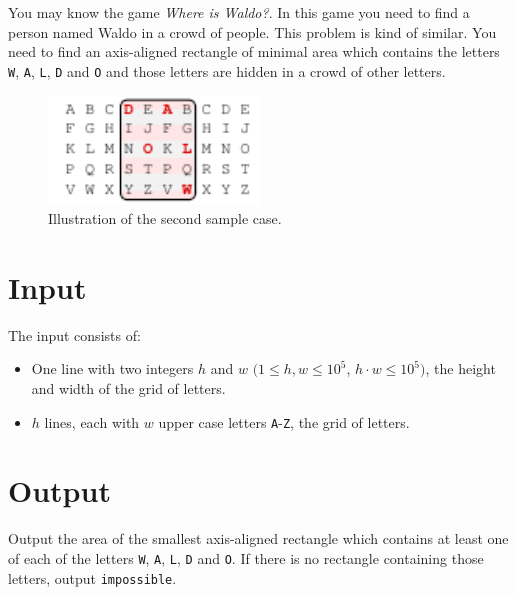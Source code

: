 
You may know the game \emph{Where is Waldo?}.
In this game you need to find a person named Waldo in a crowd of people.
This problem is kind of similar.
You need to find an axis-aligned rectangle of minimal area which contains the letters \texttt{W}, \texttt{A}, \texttt{L}, \texttt{D} and \texttt{O} and those letters are hidden in a crowd of other letters.

\begin{figure}[!h]
  \centering
  \includegraphics[width=0.5\textwidth]{sample2}
  \caption{Illustration of the second sample case.}
\end{figure}

\section*{Input}
The input consists of:
\begin{itemize}
	\item One line with two integers $h$ and $w$ $(1\leq h, w \leq 10^5$, $h\cdot{}w \leq 10^5)$, the height and width of the grid of letters.
  \item $h$ lines, each with $w$ upper case letters \texttt{A}-\texttt{Z}, the grid of letters.
\end{itemize}

\section*{Output}
Output the area of the smallest axis-aligned rectangle which contains at least one of each of the letters \texttt{W}, \texttt{A}, \texttt{L}, \texttt{D} and \texttt{O}.
If there is no rectangle containing those letters, output \texttt{impossible}.
